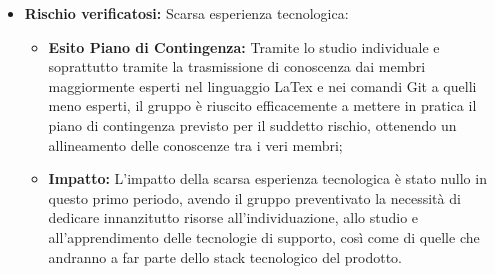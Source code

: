 \begin{itemize}
\item \textbf{Rischio verificatosi:} Scarsa esperienza tecnologica:
\begin{itemize}
\item \textbf{Esito Piano di Contingenza:} Tramite lo studio individuale e soprattutto tramite la trasmissione di conoscenza dai membri maggiormente esperti nel linguaggio LaTex e nei comandi Git a quelli meno esperti, il gruppo è riuscito efficacemente a mettere in pratica il piano di contingenza previsto per il suddetto rischio, ottenendo un allineamento delle conoscenze tra i veri membri;
\item \textbf{Impatto:} L'impatto della scarsa esperienza tecnologica è stato nullo in questo primo periodo, avendo il gruppo preventivato la necessità di dedicare innanzitutto risorse all'individuazione, allo studio e all'apprendimento delle tecnologie di supporto, così come di quelle che andranno a far parte dello stack tecnologico del prodotto.
\end{itemize}
\end{itemize}

